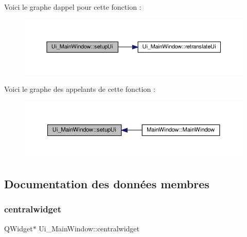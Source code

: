 Voici le graphe d\textquotesingle{}appel pour cette fonction \+:
\nopagebreak
\begin{figure}[H]
\begin{center}
\leavevmode
\includegraphics[width=350pt]{class_ui___main_window_acf4a0872c4c77d8f43a2ec66ed849b58_cgraph}
\end{center}
\end{figure}
Voici le graphe des appelants de cette fonction \+:
\nopagebreak
\begin{figure}[H]
\begin{center}
\leavevmode
\includegraphics[width=350pt]{class_ui___main_window_acf4a0872c4c77d8f43a2ec66ed849b58_icgraph}
\end{center}
\end{figure}


\subsection{Documentation des données membres}
\mbox{\label{class_ui___main_window_a356f1cf3ebda15f1fac59467ee081b74}} 
\subsubsection{\texorpdfstring{centralwidget}{centralwidget}}
{\footnotesize\ttfamily Q\+Widget$\ast$ Ui\+\_\+\+Main\+Window\+::centralwidget}

\mbox{\label{class_ui___main_window_ab0067ac42360f3cf2bb414b788d22f8e}} 
